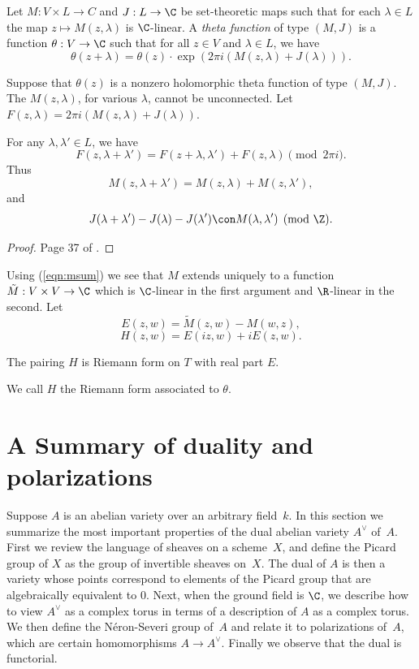 \documentclass{report}
\begin{document}
\begin{definition}
Let $M:V\times L \to C$ and $J:L\to \C$ be set-theoretic maps such
that for each $\lambda\in L$ the map $z\mapsto M(z,\lambda)$ is
$\C$-linear.  A {\em theta function} of type $(M,J)$ is a function
$\theta:V\to \C$ such that for all $z\in V$ and $\lambda\in L$, we
have
\[
  \theta(z+\lambda) = \theta(z)\cdot \exp(2\pi i(
  M(z,\lambda)+J(\lambda))).
\]
\end{definition}
Suppose that $\theta(z)$ is a nonzero holomorphic theta function
of type $(M,J)$.  The $M(z,\lambda)$, for various $\lambda$,
cannot be unconnected.  Let $F(z,\lambda)=2\pi
i(M(z,\lambda)+J(\lambda))$.
\begin{lemma}
For any $\lambda, \lambda'\in L$, we have
\[
 F(z,\lambda+\lambda') =
 F(z+\lambda,\lambda')+F(z,\lambda)\pmod{2\pi i}.
\]
Thus
\begin{equation}\label{eqn:msum}
  M(z,\lambda+\lambda') = M(z,\lambda) + M(z,\lambda'),
\end{equation}
and
\[
 J(\lambda+\lambda') - J(\lambda) - J(\lambda') \con
 M(\lambda,\lambda')\pmod{\Z}.
\]
\end{lemma}
\begin{proof}
Page 37 of \cite{swinnerton-dyer:abvars}.
\end{proof}
Using (\ref{eqn:msum}) we see that $M$ extends uniquely to a
function $\tilde{M}:V\times V\to\C$ which is $\C$-linear in the
first argument and $\R$-linear in the second.  Let
\[
  E(z,w) = \tilde{M}(z,w) - M(w,z),
\]
\[
  H(z,w) = E(iz,w) + iE(z,w).
\]
\begin{proposition}
The pairing $H$ is Riemann form on $T$ with real part $E$.
\end{proposition}
We call $H$ the Riemann form associated to $\theta$.

\section{A Summary of duality and polarizations}%
Suppose $A$ is an abelian variety over an arbitrary field~$k$.  In
this section we summarize the most important properties of the
dual abelian variety $A^{\vee}$ of~$A$.  First we review the
language of sheaves on a scheme~$X$, and define the Picard group
of $X$ as the group of invertible sheaves on~$X$. The dual of $A$
is then a variety whose points correspond to elements of the
Picard group that are algebraically equivalent to $0$. Next, when
the ground field is $\C$, we describe how to view $A^{\vee}$ as a
complex torus in terms of a description of $A$ as a complex torus.
We then define the N\'eron-Severi group of~$A$ and relate it to
polarizations of~$A$, which are certain homomorphisms $A\to
A^{\vee}$.  Finally we observe that the dual is functorial.
\end{document}

